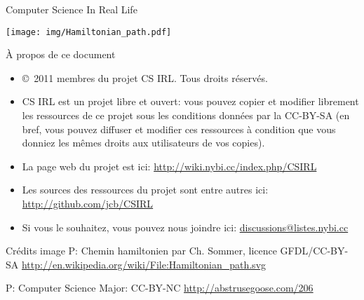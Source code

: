 \documentclass[final,hyperref={pdfpagelabels=false}]{beamer}
\renewenvironment{Coupe}{   }{   }
\renewcommand*{\footnotesize}{\fontsize{\resultfootnotesizeX}{\resultfootnotesizeY}\selectfont}
\renewcommand*{\normalsize}{\fontsize{\resultnormalsizeX}{\resultnormalsizeY}\selectfont}
\renewcommand*{\large}{\fontsize{\resultlargeX}{\resultlargeY}\selectfont}
\renewcommand*{\LARGE}{\fontsize{\resultLARGEX}{\resultLARGEY}\selectfont}
\renewcommand*{\Huge}{\fontsize{\resultHugeX}{\resultHugeY}\selectfont}
\begin{document}
\begin{Coupe}
\begin{frame}{}

  \begin{center}
    \structure{\LARGE CS IRL}

    \medskip
    {\large Computer Science In Real Life}

%
%
    \bigskip
    \bigskip
    \texttt{[image: img/Hamiltonian\_path.pdf]}\label{img:hamiltonian}
    \bigskip
    \bigskip

    \structure{\Huge Les algorithmes}
  \end{center}
\end{frame}
\begin{frame}
  \vspace{20\baselineskip}
  \vfill
  \begin{block}{À propos de ce document}
    \begin{itemize}
    \item \copyright\ 2011 membres du projet CS IRL. Tous droits réservés.

    \item CS IRL est un \alert{projet libre et ouvert}: vous pouvez copier et
      modifier librement les ressources de ce projet sous les conditions
      données par la CC-BY-SA (en bref, vous pouvez diffuser et modifier ces
      ressources à condition que vous donniez les mêmes droits aux utilisateurs
      de vos copies).
    \item La page web du projet est ici: \url{http://wiki.nybi.cc/index.php/CSIRL}
    \item Les sources des ressources du projet sont entre autres ici: \url{http://github.com/jcb/CSIRL}
    \item Si vous le souhaitez, vous pouvez nous joindre ici: \url{discussions@listes.nybi.cc}
    \end{itemize}
  \end{block}

  \begin{block}{\normalsize Crédits image}\footnotesize
    P\pageref{img:hamiltonian}: Chemin hamiltonien par Ch. Sommer,
    licence GFDL/CC-BY-SA
    \url{http://en.wikipedia.org/wiki/File:Hamiltonian_path.svg}

    P\pageref{img:CSmajor}: Computer Science Major: CC-BY-NC
    \url{http://abstrusegoose.com/206}


\end{block}
\end{frame}
\end{Coupe}
\end{document}
